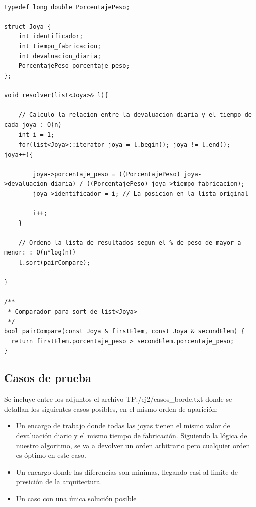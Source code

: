 \begin{lstlisting}
               
typedef long double PorcentajePeso;

struct Joya {
	int identificador;
	int tiempo_fabricacion;
	int devaluacion_diaria;
	PorcentajePeso porcentaje_peso;
};

void resolver(list<Joya>& l){
	
	// Calculo la relacion entre la devaluacion diaria y el tiempo de cada joya : O(n)
	int i = 1;
	for(list<Joya>::iterator joya = l.begin(); joya != l.end(); joya++){
		
		joya->porcentaje_peso = ((PorcentajePeso) joya->devaluacion_diaria) / ((PorcentajePeso) joya->tiempo_fabricacion);
		joya->identificador = i; // La posicion en la lista original
		
		i++;
	}
	
	// Ordeno la lista de resultados segun el % de peso de mayor a menor: : O(n*log(n)) 
	l.sort(pairCompare);

}

/**
 * Comparador para sort de list<Joya>
 */
bool pairCompare(const Joya & firstElem, const Joya & secondElem) {
  return firstElem.porcentaje_peso > secondElem.porcentaje_peso;
}
\end{lstlisting}

\subsection{Casos de prueba}

Se incluye entre los adjuntos el archivo TP:/ej2/casos\_borde.txt donde se detallan los siguientes casos posibles, en el mismo orden de aparici\'on:

\begin{itemize}
\item Un encargo de trabajo donde todas las joyas tienen el mismo valor de devaluaci\'on diario y el mismo tiempo de fabricaci\'on. Siguiendo la l\'ogica de nuestro algoritmo, se va a devolver un orden arbitrario pero cualquier orden es \'optimo en este caso.
\item Un encargo donde las diferencias son minimas, llegando casi al limite de presici\'on de la arquitectura.
\item Un caso con una \'unica soluci\'on posible
\end{itemize}

